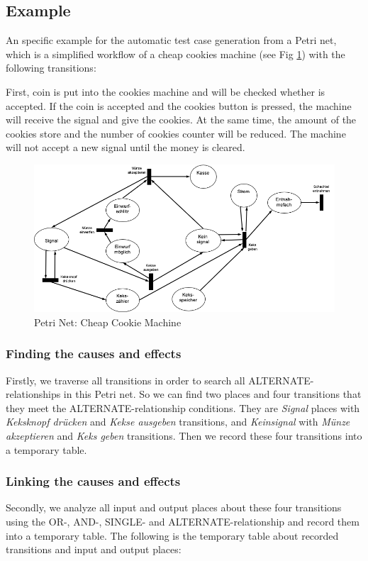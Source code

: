 \subsection{Example}
An specific example for the automatic test case generation from a Petri net, which is a simplified workflow of a cheap cookies machine (see Fig \ref{fig:cheap-cookie-machine}) with the following transitions:

First, coin is put into the cookies machine and will be checked whether is accepted. If the coin is accepted and the cookies button is pressed, the machine will receive the signal and give the cookies. At the same time, the amount of the cookies store and the number of cookies counter will be reduced. The machine will not accept a new signal until the money is cleared. \\

\begin{figure}
  \centering
  \includegraphics[scale=0.45]{src/pic/cheap-cookie-machine.png}
  \caption{Petri Net: Cheap Cookie Machine \cite{Hein}}
  \label{fig:cheap-cookie-machine}
\end{figure}

\subsubsection{Finding the causes and effects}
Firstly, we traverse all transitions in order to search all ALTERNATE-relationships in this Petri net. So we can find two places and four transitions that they meet the ALTERNATE-relationship conditions. They are \emph{Signal} places with \emph{Keksknopf drücken} and \emph{Kekse ausgeben} transitions, and \emph{Keinsignal} with \emph{Münze akzeptieren} and \emph{Keks geben} transitions. Then we record these four transitions into a temporary table.

\subsubsection{Linking the causes and effects}
Secondly, we analyze all input and output places about these four transitions using the OR-, AND-, SINGLE- and ALTERNATE-relationship and record them into a temporary table. The following is the temporary table about recorded transitions and input and output places:


